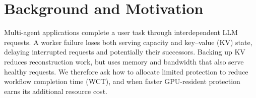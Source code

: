 \section{Background and Motivation}
\label{sec:background-motivation}

Multi-agent applications complete a user task through interdependent LLM
requests. A worker failure loses both serving capacity and key--value (KV)
state, delaying interrupted requests and potentially their successors.
Backing up KV reduces reconstruction work, but uses memory and bandwidth
that also serve healthy requests. We therefore ask how to allocate limited
protection to reduce workflow completion time (WCT), and when faster
GPU-resident protection earns its additional resource cost.

